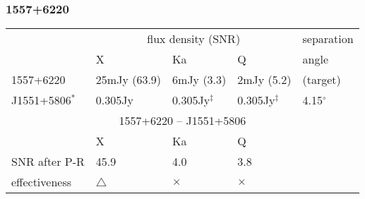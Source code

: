 \subsubsection{
  1557+6220
}
\begin{tabular}{p{30mm}|p{30mm}|p{30mm}|p{30mm}|p{20mm}}
\hline
                 & \multicolumn{3}{c|}{flux density (SNR)}
                 & separation \\
\cline{2-4}
                 & X
                 & Ka
                 & Q
                 & angle \\
\hline
1557+6220        &  25mJy (63.9)
                 &   6mJy (3.3)
                 &   2mJy (5.2)
                 & (target)   \\
\hline
J1551+5806$^*$   & 0.305Jy
                 & 0.305Jy$^\ddag$
                 & 0.305Jy$^\ddag$
                 & 4.15$^\circ$ \\
\hline
\hline
\multicolumn{5}{c}{1557+6220 -- J1551+5806}         \\
\hline
              &  X          & Ka         & \multicolumn{2}{l}{Q}       \\
\hline
SNR after P-R & 45.9        &  4.0       & \multicolumn{2}{l}{3.8}     \\
\hline
effectiveness & $\triangle$ & $\times$   & \multicolumn{2}{l}{$\times$}\\
\hline
\end{tabular}

